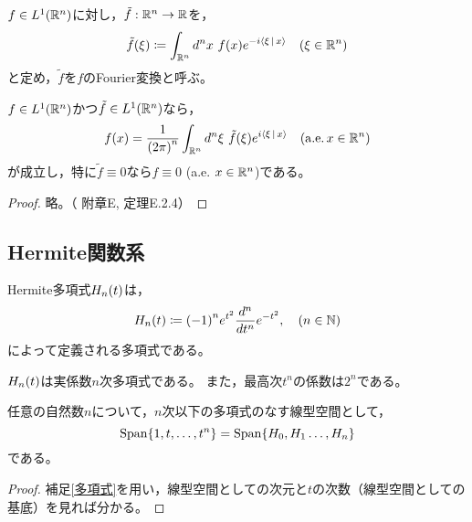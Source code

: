 \documentclass[a4paper,draft]{ltjsarticle}
\begin{document}
\begin{defi}[$n$次元Fourier変換]
    $f\in\fun{L^1}{\R^n}$に対し，$\tilde{f}:\mathbb{R}^n\to \mathbb{R}$を，
    \begin{align}
        \fun{\tilde{f}}{\xi} \coloneqq \int_{\R^n} d^nx\ \fun{f}{x}e^{-i\inner{\xi}{x}}\quad\pare{\xi\in\R^n}
    \end{align}
    と定め，$\tilde{f}$を$f$のFourier変換と呼ぶ。
\end{defi}

\begin{lem}[$n$次元Fourier変換の一意性]\label{補題：一意性}
    $f\in\fun{L^1}{\R^n}$かつ$\tilde{f}\in\fun{L^1}{\R^n}$なら，
    \begin{equation}
        \fun{f}{x}
        =\dfrac{1}{\pare{2\pi}^n}\int_{\R^n}d^n\xi\ \fun{\tilde{f}}{\xi}e^{i\inner{\xi}{x}}\quad \pare{\mathrm{a.e.}\, x\in\R^n}
    \end{equation}
    が成立し，特に$\tilde{f}\equiv0$なら$f\equiv0$ (a.e. $x\in\mathbb{R}^n$)である。
    \begin{proof}
        略。（\cite[野村]{nomura} 附章E, 定理E.2.4）
    \end{proof}
\end{lem}

\subsection{Hermite関数系}
\begin{defi}[Hermite多項式]
    Hermite多項式$\fun{H_n}{t}$は，
    \begin{equation}
        \label{hermite}
        \fun{H_n}{t}\coloneqq \pare{-1}^n e^{t^2}\diffn{}{t}{n}e^{-t^2},\quad\pare{n\in\N}
    \end{equation}
    によって定義される多項式である。
\end{defi}

\begin{supple}\label{多項式}
    $\fun{H_n}{t}$は実係数$n$次多項式である。
    また，最高次$t^n$の係数は$2^n$である。
\end{supple}

\begin{supple}
    任意の自然数$n$について，$n$次以下の多項式のなす線型空間として，
    \begin{equation}
        \mathrm{Span}\bra{1,t,\dots,t^n}=\mathrm{Span}\bra{H_0,H_1\dots,H_n}
    \end{equation}
    である。
    \begin{proof}
        補足\ref{多項式}を用い，線型空間としての次元と$t$の次数（線型空間としての基底）を見れば分かる。        
    \end{proof}
\end{supple}
\end{document}
